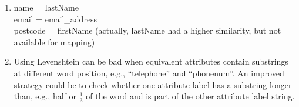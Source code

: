 \documentclass{scrartcl}
\begin{document}
\begin{enumerate}
		\item name = lastName\\
		email = email\_address\\
		postcode = firstName (actually, lastName had a higher similarity, but not available for mapping)
		
		\item Using Levenshtein can be bad when equivalent attributes contain substrings at different word position, e.g., \enquote{telephone} and \enquote{phonenum}.
		An improved strategy could be to check whether one attribute label has a substring longer than, e.g., half or $\frac{1}{3}$ of the word and is part of the other attribute label string.
	\end{enumerate}
\end{document}
